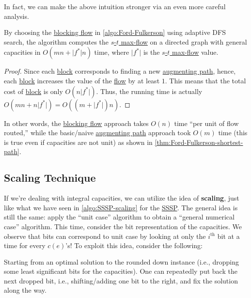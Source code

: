 In fact, we can make the above intuition stronger via an even more careful analysis.

\begin{corollary}\label{col:Ford-Fulkerson-blocking-flow-general}
	By choosing the \hyperref[def:blocking-flow]{blocking flow} in \autoref{algo:Ford-Fulkerson} using adaptive DFS search, the algorithm computes the \hyperref[prb:s-t-max-flow]{\(s\)-\(t\) max-flow} on a directed graph with general capacities in \(O(mn + \lvert f^{\ast} \rvert n)\) time, where \(\lvert f^{\ast} \rvert \) is the \hyperref[prb:s-t-max-flow]{\(s\)-\(t\) max-flow} value.
\end{corollary}
\begin{proof}
	Since each \hyperref[algo:general-adaptive-DFS-block]{block} corresponds to finding a new \hyperref[def:augmenting-path]{augmenting path}, hence, each \hyperref[algo:general-adaptive-DFS-block]{block} increases the value of the \hyperref[def:flow]{flow} by at least \(1\). This means that the total cost of \hyperref[algo:general-adaptive-DFS-block]{block} is only \(O(n \lvert f^{\ast} \rvert )\). Thus, the running time is actually \(O(mn + n \lvert f^{\ast} \rvert ) = O((m + \lvert f^{\ast} \rvert) n)\).
\end{proof}

In other words, the \hyperref[def:blocking-flow]{blocking flow} approach takes \(O(n)\) time ``per unit of flow routed,'' while the basic/naive \hyperref[def:augmenting-path]{augmenting path} approach took \(O(m)\) time (this is true even if capacities are not unit) as shown in \autoref{thm:Ford-Fulkerson-shortest-path}.

\subsection{Scaling Technique}
If we're dealing with integral capacities, we can utilize the idea of \textbf{scaling}, just like what we have seen in \autoref{algo:SSSP-scaling} for the \hyperref[prb:SSSP]{SSSP}. The general idea is still the same: apply the ``unit case'' algorithm to obtain a ``general numerical case'' algorithm. This time, consider the bit representation of the capacities. We observe that bits can correspond to unit case by looking at only the \(i^{\text{th} }\) bit at a time for every \(c(e)\)'s! To exploit this idea, consider the following:

\begin{intuition}
	Starting from an optimal solution to the rounded down instance (i.e., dropping some least significant bits for the capacities). One can repeatedly put back the next dropped bit, i.e., shifting/adding one bit to the right, and fix the solution along the way.
\end{intuition}

